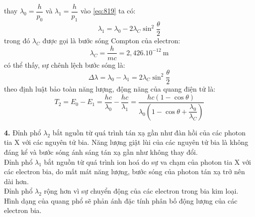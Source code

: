 thay $\lambda_{0}=\dfrac{h}{p_{0}}$ và $\lambda_{1}=\dfrac{h}{p_{1}}$ vào \eqref{eq:819} ta có:
\begin{equation}
  \label{eq:820}
  \lambda_{1}=\lambda_{0}-2\lambda_{C}\sin^{2}\frac{\theta}{2}
\end{equation}
trong đó $\lambda_{C}$ được gọi là bước sóng Compton của electron:
\begin{equation}
  \label{eq:821}
  \lambda_{C}=\frac{h}{mc}=2,426.10^{-12}\SI{ }{\meter}
\end{equation}
có thể thấy, sự chênh lệch bước sóng là:
\begin{equation*}
  \Delta\lambda=\lambda_{0}-\lambda_{1}=2\lambda_{C}\sin^{2}\frac{\theta}{2}
\end{equation*}
theo định luật bảo toàn năng lượng, động năng của quang điện tử là:
\begin{equation}
  \label{eq:822}
  T_{2}=E_{0}-E_{1}=\frac{hc}{\lambda_{0}}-\frac{hc}{\lambda_{1}}=\frac{hc(1-\cos\theta)}{\lambda_{0}\left(1-\cos\theta+\dfrac{\lambda_{0}}{\lambda_{C}}\right)}
\end{equation}

\noindent\textbf{4.} Đỉnh phổ $\lambda_{2}$ bắt nguồn từ quá trình tán xạ gần như đàn hồi của các photon tia X với các nguyên tử bia. Năng lượng giật lùi của các nguyên tử bia là không đáng kể và bước sóng ánh sáng tán xạ gần như không thay đổi.\\
\indent Đỉnh phổ $\lambda_{1}$ bắt nguồn từ quá trình ion hoá do sự va chạm của photon tia X với các electron bia, do mất mát năng lượng, bước sóng của photon tán xạ trở nên dài hơn.\\
\indent Đỉnh phổ $\lambda_{2}$ rộng hơn vì sự chuyển động của các electron trong bia kim loại. Hình dạng của quang phổ sẽ phản ánh đặc tính phân bố động lượng của các electron bia.\\
